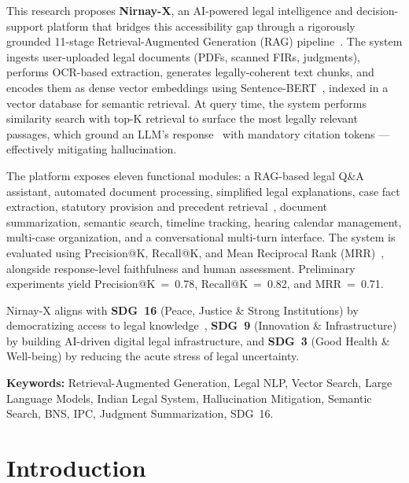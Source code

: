 \documentclass[12pt,a4paper]{article}
\begin{document}
This research proposes \textbf{Nirnay-X}, an AI-powered legal intelligence and
decision-support platform that bridges this accessibility gap through a rigorously
grounded 11-stage Retrieval-Augmented Generation (RAG) pipeline~\cite{lewis2020rag}.
The system ingests user-uploaded legal documents (PDFs, scanned FIRs, judgments),
performs OCR-based extraction, generates legally-coherent text chunks, and encodes them
as dense vector embeddings using Sentence-BERT~\cite{reimers2019sbert}, indexed in a
vector database for semantic retrieval. At query time, the system performs similarity
search with top-K retrieval to surface the most legally relevant passages, which ground
an LLM's response~\cite{vaswani2017attention} with mandatory citation tokens ---
effectively mitigating hallucination.

The platform exposes eleven functional modules: a RAG-based legal Q\&A assistant,
automated document processing, simplified legal explanations, case fact extraction,
statutory provision and precedent retrieval~\cite{feng2022survey}, document
summarization, semantic search, timeline tracking, hearing calendar management,
multi-case organization, and a conversational multi-turn interface. The system is
evaluated using Precision@K, Recall@K, and Mean Reciprocal Rank (MRR)~\cite{manning2008ir},
alongside response-level faithfulness and human assessment. Preliminary experiments
yield Precision@K~=~0.78, Recall@K~=~0.82, and MRR~=~0.71.

Nirnay-X aligns with \textbf{SDG~16} (Peace, Justice \& Strong Institutions)
by democratizing access to legal knowledge~\cite{const_india}, \textbf{SDG~9}
(Innovation \& Infrastructure) by building AI-driven digital legal infrastructure, and
\textbf{SDG~3} (Good Health \& Well-being) by reducing the acute stress of legal
uncertainty.

\vspace{0.4cm}
\noindent\textbf{Keywords:} Retrieval-Augmented Generation, Legal NLP, Vector Search,
Large Language Models, Indian Legal System, Hallucination Mitigation, Semantic Search,
BNS, IPC, Judgment Summarization, SDG~16.

\newpage
\tableofcontents

\newpage
\section{Introduction}
\end{document}

